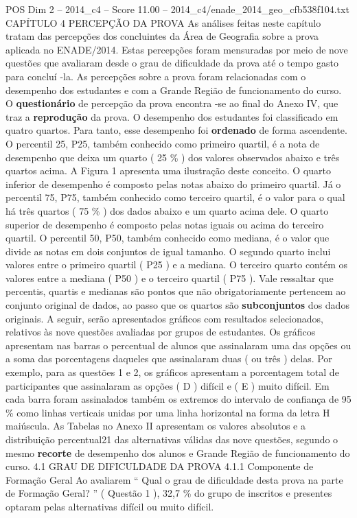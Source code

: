\begin{textsample}{POS Dim 2 – 2014\_c4 – Score 11.00 – 2014\_c4/enade\_2014\_geo\_cfb538f104.txt}  \label{ex:f2_pos_118}
CAPÍTULO 4 PERCEPÇÃO DA PROVA As análises feitas neste capítulo tratam das percepções dos concluintes da Área de Geografia sobre a prova aplicada no ENADE/2014.
Estas percepções foram mensuradas por meio de nove questões que avaliaram desde o grau de dificuldade da prova até o tempo gasto para concluí -la.
As percepções sobre a prova foram relacionadas com o desempenho dos estudantes e com a Grande Região de funcionamento do curso.
O \textbf{questionário} de percepção da prova encontra -se ao final do Anexo IV, que traz a \textbf{reprodução} da prova.
O desempenho dos estudantes foi classificado em quatro quartos.
Para tanto, esse desempenho foi \textbf{ordenado} de forma ascendente.
O percentil 25, P25, também conhecido como primeiro quartil, é a nota de desempenho que deixa um quarto ( 25 \% ) dos valores observados abaixo e três quartos acima.
A Figura 1 apresenta uma ilustração deste conceito.
O quarto inferior de desempenho é composto pelas notas abaixo do primeiro quartil.
Já o percentil 75, P75, também conhecido como terceiro quartil, é o valor para o qual há três quartos ( 75 \% ) dos dados abaixo e um quarto acima dele.
O quarto superior de desempenho é composto pelas notas iguais ou acima do terceiro quartil.
O percentil 50, P50, também conhecido como mediana, é o valor que divide as notas em dois conjuntos de igual tamanho.
O segundo quarto inclui valores entre o primeiro quartil ( P25 ) e a mediana.
O terceiro quarto contém os valores entre a mediana ( P50 ) e o terceiro quartil ( P75 ).
Vale ressaltar que percentis, quartis e medianas são pontos que não obrigatoriamente pertencem ao conjunto original de dados, ao passo que os quartos são \textbf{subconjuntos} dos dados originais.
A seguir, serão apresentados gráficos com resultados selecionados, relativos às nove questões avaliadas por grupos de estudantes.
Os gráficos apresentam nas barras o percentual de alunos que assinalaram uma das opções ou a soma das porcentagens daqueles que assinalaram duas ( ou três ) delas.
Por exemplo, para as questões 1 e 2, os gráficos apresentam a porcentagem total de participantes que assinalaram as opções ( D ) difícil e ( E ) muito difícil.
Em cada barra foram assinalados também os extremos do intervalo de confiança de 95 \% como linhas verticais unidas por uma linha horizontal na forma da letra H maiúscula.
As Tabelas no Anexo II apresentam os valores absolutos e a distribuição percentual21 das alternativas válidas das nove questões, segundo o mesmo \textbf{recorte} de desempenho dos alunos e Grande Região de funcionamento do curso. 4.1 GRAU DE DIFICULDADE DA PROVA 4.1.1 Componente de Formação Geral Ao avaliarem “ Qual o grau de dificuldade desta prova na parte de Formação Geral? ” ( Questão 1 ), 32,7 \% do grupo de inscritos e presentes optaram pelas alternativas difícil ou muito difícil.

\end{textsample}
